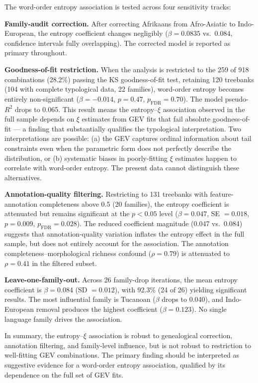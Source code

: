 \documentclass[11pt,letterpaper]{article}
\begin{document}
The word-order entropy association is tested across four sensitivity tracks:

\textbf{Family-audit correction.} After correcting Afrikaans from Afro-Asiatic to Indo-European, the entropy coefficient changes negligibly ($\beta = 0.0835$ vs.\ $0.084$, confidence intervals fully overlapping). The corrected model is reported as primary throughout.

\textbf{Goodness-of-fit restriction.} When the analysis is restricted to the 259 of 918 combinations (28.2\%) passing the KS goodness-of-fit test, retaining 120 treebanks (104 with complete typological data, 22 families), word-order entropy becomes entirely non-significant ($\beta = -0.014$, $p = 0.47$, $p_{\text{FDR}} = 0.70$). The model pseudo-$R^2$ drops to 0.065. This result means the entropy--$\xi$ association observed in the full sample depends on $\xi$ estimates from GEV fits that fail absolute goodness-of-fit --- a finding that substantially qualifies the typological interpretation. Two interpretations are possible: (a) the GEV captures ordinal information about tail constraints even when the parametric form does not perfectly describe the distribution, or (b) systematic biases in poorly-fitting $\xi$ estimates happen to correlate with word-order entropy. The present data cannot distinguish these alternatives.

\textbf{Annotation-quality filtering.} Restricting to 131 treebanks with feature-annotation completeness above 0.5 (20 families), the entropy coefficient is attenuated but remains significant at the $p < 0.05$ level ($\beta = 0.047$, SE $= 0.018$, $p = 0.009$, $p_{\text{FDR}} = 0.028$). The reduced coefficient magnitude (0.047 vs.\ 0.084) suggests that annotation-quality variation inflates the entropy effect in the full sample, but does not entirely account for the association. The annotation completeness--morphological richness confound ($\rho = 0.79$) is attenuated to $\rho = 0.41$ in the filtered subset.

\textbf{Leave-one-family-out.} Across 26 family-drop iterations, the mean entropy coefficient is $\beta = 0.084$ (SD $= 0.012$), with 92.3\% (24 of 26) yielding significant results. The most influential family is Tucanoan ($\beta$ drops to 0.040), and Indo-European removal produces the highest coefficient ($\beta = 0.123$). No single language family drives the association.

In summary, the entropy--$\xi$ association is robust to genealogical correction, annotation filtering, and family-level influence, but is not robust to restriction to well-fitting GEV combinations. The primary finding should be interpreted as suggestive evidence for a word-order entropy association, qualified by its dependence on the full set of GEV fits.
\end{document}
